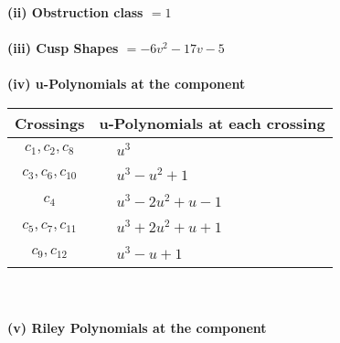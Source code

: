 \documentclass[1p]{elsarticle_modified}
\theoremstyle{definition}
\begin{document}
\flushleft \textbf{(ii) Obstruction class $= 1$}\\~\\
\flushleft \textbf{(iii) Cusp Shapes $= -6 v^2-17 v-5$}\\~\\
\newpage\renewcommand{\arraystretch}{1}
\flushleft \textbf{(iv) u-Polynomials at the component}\newline \\
\begin{tabular}{m{50pt}|m{274pt}}
Crossings & \hspace{64pt}u-Polynomials at each crossing \\
\hline $$\begin{aligned}c_{1},c_{2},c_{8}\end{aligned}$$&$\begin{aligned}
&u^3
\end{aligned}$\\
\hline $$\begin{aligned}c_{3},c_{6},c_{10}\end{aligned}$$&$\begin{aligned}
&u^3- u^2+1
\end{aligned}$\\
\hline $$\begin{aligned}c_{4}\end{aligned}$$&$\begin{aligned}
&u^3-2 u^2+u-1
\end{aligned}$\\
\hline $$\begin{aligned}c_{5},c_{7},c_{11}\end{aligned}$$&$\begin{aligned}
&u^3+2 u^2+u+1
\end{aligned}$\\
\hline $$\begin{aligned}c_{9},c_{12}\end{aligned}$$&$\begin{aligned}
&u^3- u+1
\end{aligned}$\\
\hline
\end{tabular}\\~\\
\newpage\renewcommand{\arraystretch}{1}
\flushleft \textbf{(v) Riley Polynomials at the component}\newline \\
\end{document}
